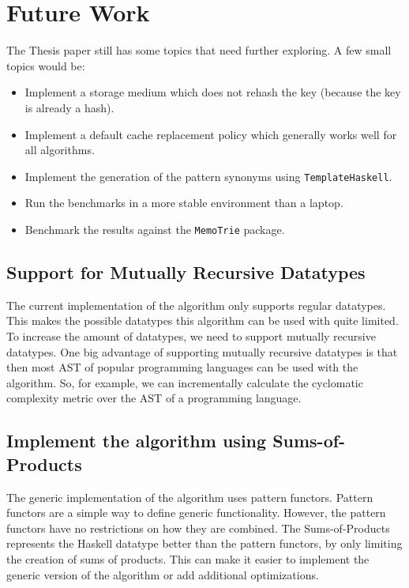 \section{Future Work}


The Thesis paper still has some topics that need further exploring. A few small topics would be: 
\begin{itemize}
  \item Implement a storage medium which does not rehash the key (because the key is already a hash).
  \item Implement a default cache replacement policy which generally works well for all algorithms. 
  \item Implement the generation of the pattern synonyms using \texttt{TemplateHaskell}.
  \item Run the benchmarks in a more stable environment than a laptop.
  \item Benchmark the results against the \texttt{MemoTrie} package.
\end{itemize}

\subsection{Support for Mutually Recursive Datatypes}
The current implementation of the algorithm only supports regular datatypes. This makes the possible datatypes this algorithm can be used with quite limited. To increase the amount of datatypes, we need to support mutually recursive datatypes. One big advantage of supporting mutually recursive datatypes is that then most AST of popular programming languages can be used with the algorithm. So, for example, we can incrementally calculate the cyclomatic complexity metric over the AST of a programming language.

\subsection{Implement the algorithm using Sums-of-Products}
The generic implementation of the algorithm uses pattern functors. Pattern functors are a simple way to define generic functionality. However, the pattern functors have no restrictions on how they are combined. The Sums-of-Products represents the Haskell datatype better than the pattern functors, by only limiting the creation of sums of products. This can make it easier to implement the generic version of the algorithm or add additional optimizations.

